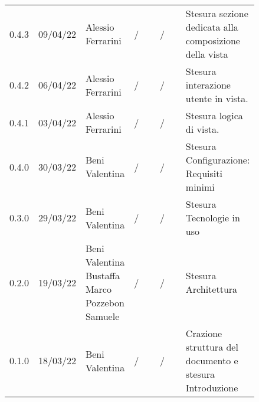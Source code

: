 {\begin{tabular}{p{0.10\linewidth}p{0.10\linewidth}p{0.15\linewidth}p{0.15\linewidth}p{0.15\linewidth}p{0.19\linewidth}}
	0.4.3 & 09/04/22 & Alessio Ferrarini & / & / & Stesura sezione dedicata alla
  composizione della vista \\
	\rowcolor[RGB]{233, 245, 206}
	0.4.2 & 06/04/22 & Alessio Ferrarini & / & / & Stesura interazione utente in
  vista. \\
	\rowcolor[RGB]{216, 235, 171}
	0.4.1 & 03/04/22 & Alessio Ferrarini & / & / & Stesura logica di vista. \\
	\rowcolor[RGB]{233, 245, 206}
	0.4.0 & 30/03/22 & Beni Valentina & / & / & Stesura Configurazione: Requisiti minimi\\
	\rowcolor[RGB]{216, 235, 171}
	0.3.0 & 29/03/22 & Beni Valentina & / & / & Stesura Tecnologie in uso\\
	\rowcolor[RGB]{233, 245, 206}
	0.2.0 & 19/03/22 & Beni Valentina Bustaffa Marco Pozzebon Samuele & / & / & Stesura Architettura\\
	\rowcolor[RGB]{216, 235, 171}
	0.1.0 & 18/03/22 & Beni Valentina & / & / & Crazione struttura del documento e stesura Introduzione\\
\end{tabular}
}
